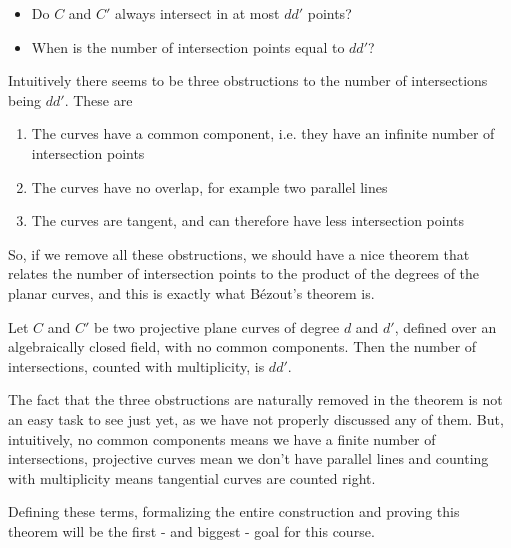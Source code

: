 \begin{itemize}
    \item Do $C$ and $C'$ always intersect in at most $dd'$ points?
    \item When is the number of intersection points equal to $dd'$?
\end{itemize}

Intuitively there seems to be three obstructions to the number of intersections being $dd'$. These are
\begin{enumerate}
    \item The curves have a common component, i.e. they have an infinite number of intersection points
    \item The curves have no overlap, for example two parallel lines
    \item The curves are tangent, and can therefore have less intersection points
\end{enumerate}

So, if we remove all these obstructions, we should have a nice theorem that relates the number of intersection points to the product of the degrees of the planar curves, and this is exactly what Bézout's theorem is. 

\begin{theorem}
Let $C$ and $C'$ be two projective plane curves of degree $d$ and $d'$, defined over an algebraically closed field, with no common components. Then the number of intersections, counted with multiplicity, is $dd'$.
\end{theorem}

The fact that the three obstructions are naturally removed in the theorem is not an easy task to see just yet, as we have not properly discussed any of them. But, intuitively, no common components means we have a finite number of intersections, projective curves mean we don't have parallel lines and counting with multiplicity means tangential curves are counted right. 

Defining these terms, formalizing the entire construction and proving this theorem will be the first - and biggest - goal for this course. 
